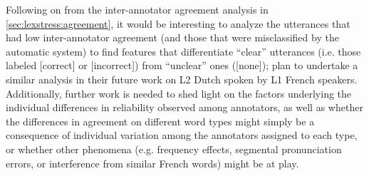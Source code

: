 
Following on from the inter-annotator agreement analysis in \cref{sec:lexstress:agreement}, it would be interesting to analyze the utterances that had low inter-annotator agreement (and those that were misclassified by the automatic system) to find features that differentiate ``clear'' utterances (i.e. those labeled [correct] or [incorrect]) from ``unclear'' ones ([none]); \textcite{Michaux2013} plan to undertake a similar analysis in their future work on L2 Dutch spoken by L1 French speakers. Additionally, further work is needed to shed light on the factors underlying the individual differences in reliability observed among annotators, as well as whether the differences in agreement on different word types might simply be a consequence of individual variation among the annotators assigned to each type, or whether other phenomena (e.g. frequency effects, segmental pronunciation errors, or interference from similar French words) might be at play.





	



